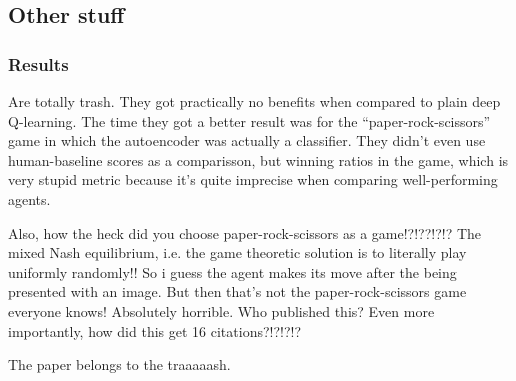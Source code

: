 \documentclass{article}
\begin{document}
\subsection{Other stuff}
\subsubsection{Results}
Are totally trash. They got practically no benefits when compared to plain deep Q-learning.
The time they got a better result was for the ``paper-rock-scissors'' game
in which the autoencoder was actually a classifier.
They didn't even use human-baseline scores as a comparisson, but
winning ratios in the game, which is very stupid metric because it's quite imprecise
when comparing well-performing agents.

Also, how the heck did you choose paper-rock-scissors as a game!?!??!?!?
The mixed Nash equilibrium, i.e. the game theoretic solution is to literally play
uniformly randomly!!
So i guess the agent makes its move after the being presented with an image.
But then that's not the paper-rock-scissors game everyone knows!
Absolutely horrible. Who published this?
Even more importantly, how did this get 16 citations?!?!?!?

The paper belongs to the traaaaash.
\end{document}
